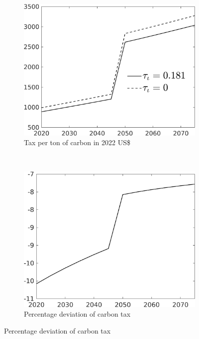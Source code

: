  \begin{figure}[h!!]
 	\centering
 	\caption{Necessary carbon tax with and without progressive income tax  }\label{fig:Limit_nsk0_xgr0_know}		
 	\begin{subfigure}[]{0.4\textwidth}
 		\caption{Tax per ton of carbon in 2022 US\$}
 		\includegraphics[width=1\textwidth]{../../codding_model/own_basedOnFried/optimalPol_010922_revision/figures/all_13Sept22/CompTauf_bytaul_Reg5_Tauf_spillover0_nsk0_xgr0_knspil0_sep0_LFlimit1_emsbase0_countec0_GovRev0_etaa0.79_lgd1.png}
 	\end{subfigure}	
 \begin{minipage}[]{0.1\textwidth}
\
 \end{minipage}
 	\begin{subfigure}[]{0.4\textwidth}
 	\caption{Percentage deviation of carbon tax}
 	\includegraphics[width=1\textwidth]{../../codding_model/own_basedOnFried/optimalPol_010922_revision/figures/all_13Sept22/CompTaufPER_bytaul_Reg5_Tauf_spillover0_nsk0_xgr0_knspil0_sep0_LFlimit1_emsbase0_countec0_GovRev0_etaa0.79_lgd0.png} \end{subfigure}		
	\vspace{2mm}
	

\end{figure}
